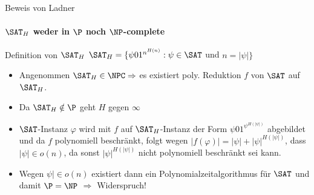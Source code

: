 \begin{frame}{Beweis von Ladner}
		\framesubtitle{${\SAT}_H$ weder in $\P$ noch $\NP$-complete}
	
		\begin{KITinfoblock}{Definition von ${\SAT}_H$}	
			${\SAT}_H = \lbrace \psi 01^{n^{H(n)}} : \psi \in \SAT$ und $ n = |\psi| \rbrace$
		\end{KITinfoblock}
		
		
		\bigskip
		
		\bigskip
		\pause
		\begin{itemize}[<+->]
		\item Angenommen ${\SAT}_H \in \NPC \Rightarrow $ es existiert poly. Reduktion $f$ von $\SAT$ auf ${\SAT}_H$.
		\item Da ${\SAT}_H \notin \P $ geht $H$ gegen $\infty$ 
		\item $\SAT$-Instanz $\varphi$ wird mit $f$ auf ${\SAT}_H$-Instanz der Form $\psi01^{{\psi}^{H(|\psi|)}}$ abgebildet und da $f$ polynomiell beschränkt, folgt wegen \newline
		$|f(\varphi)|=|\psi| + {|\psi|}^{H(|\psi|)}$, dass $|\psi| \in o(n)$,
		da sonst  ${|\psi|}^{H(|\psi|)}$ nicht polynomiell beschränkt sei kann.
		\item Wegen $\psi| \in o(n)$ existiert dann ein Polynomialzeitalgorithmus für $\SAT$ und damit $\P = \NP$  $\Rightarrow$ Widerspruch! 
		
		\end{itemize}
\end{frame}